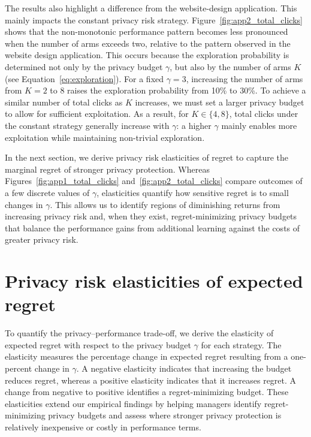 \documentclass[mksc,nonblindrev]{informs3}
\begin{document}
The results also highlight a difference from the website-design application. This mainly impacts the constant privacy risk strategy. Figure~\ref{fig:app2_total_clicks} shows that the non-monotonic performance pattern becomes less pronounced when the number of arms exceeds two, relative to the pattern observed in the website design application. This occurs because the exploration probability is determined not only by the privacy budget $\gamma$, but also by the number of arms $K$ (see Equation~\ref{eq:exploration}). For a fixed $\gamma=3$, increasing the number of arms from $K=2$ to $8$ raises the exploration probability from 10\% to 30\%. To achieve a similar number of total clicks as $K$ increases, we must set a larger privacy budget to allow for sufficient exploitation. As a result, for $K \in \{4,8\}$, total clicks under the constant strategy generally increase with $\gamma$: a higher $\gamma$ mainly enables more exploitation while maintaining non-trivial exploration.

In the next section, we derive privacy risk elasticities of regret to capture the marginal regret of stronger privacy protection. Whereas Figures~\ref{fig:app1_total_clicks} and~\ref{fig:app2_total_clicks} compare outcomes of a few discrete values of $\gamma$, elasticities quantify how sensitive regret is to small changes in $\gamma$. This allows us to identify regions of diminishing returns from increasing privacy risk and, when they exist, regret-minimizing privacy budgets that balance the performance gains from additional learning against the costs of greater privacy risk.

\section{Privacy risk elasticities of expected regret}
\label{sec:elasticity}
To quantify the privacy--performance trade-off, we derive the elasticity of expected regret with respect to the privacy budget $\gamma$ for each strategy. The elasticity measures the percentage change in expected regret resulting from a one-percent change in $\gamma$. A negative elasticity indicates that increasing the budget reduces regret, whereas a positive elasticity indicates that it increases regret. A change from negative to positive identifies a regret-minimizing budget. These elasticities extend our empirical findings by helping managers identify regret-minimizing privacy budgets and assess where stronger privacy protection is relatively inexpensive or costly in performance terms.
\end{document}
